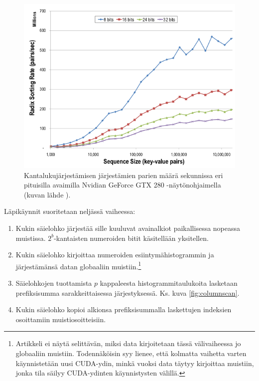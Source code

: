 \documentclass[a4paper,11pt]{article}
\begin{document}
\begin{figure}
\centering
\includegraphics[scale = 0.45]{radix_sort_varying_key_size}
\caption{Kantalukujärjestämisen järjestämien parien määrä sekunnissa eri pituisilla avaimilla Nvidian GeForce GTX 280 -näytönohjaimella (kuvan lähde \cite{satish2009}).}
\label{fig:radix_sort_varying_key_size}
\end{figure}

Läpikäynnit suoritetaan neljässä vaiheessa:
\begin{singlespace*}
\begin{enumerate}
\item Kukin säielohko järjestää sille kuuluvat avainalkiot paikallisessa nopeassa muistissa. $2^b$-kantaisten numeroiden bitit käsitellään yksitellen.
\item Kukin säielohko kirjoittaa numeroiden esiintymähistogrammin ja järjestämänsä datan globaaliin muistiin.\footnote{Artikkeli ei näytä selittävän, miksi data kirjoitetaan tässä välivaiheessa jo globaaliin muistiin. Todennäköisin syy lienee, että kolmatta vaihetta varten käynnistetään uusi CUDA-ydin, minkä vuoksi data täytyy kirjoittaa muistiin, jonka tila säilyy CUDA-ydinten käynnistysten välillä.}
\item Säielohkojen tuottamista $p$ kappaleesta histogrammitaulukoita lasketaan prefiksisumma sarakkeittaisessa järjestyksessä. Ks. kuva \ref{fig:columnscan}.
\item Kukin säielohko kopioi alkionsa prefiksisummalla laskettujen indeksien osoittamiin muistiosoitteisiin.
\end{enumerate}
\end{singlespace*}
\end{document}
